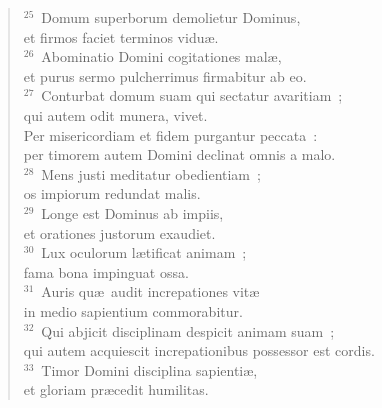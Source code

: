 \begin{flushleft}\begin{verse}${}^{25}$~Domum superborum demolietur Dominus,\\ et firmos faciet terminos vidu\ae .\\
${}^{26}$~Abominatio Domini cogitationes mal\ae ,\\ et purus sermo pulcherrimus firmabitur ab eo.\\
${}^{27}$~Conturbat domum suam qui sectatur avaritiam~;\\ qui autem odit munera, vivet.\\ Per misericordiam et fidem purgantur peccata~:\\ per timorem autem Domini declinat omnis a malo.\\
${}^{28}$~Mens justi meditatur obedientiam~;\\ os impiorum redundat malis.\\
${}^{29}$~Longe est Dominus ab impiis,\\ et orationes justorum exaudiet.\\
${}^{30}$~Lux oculorum l\ae tificat animam~;\\ fama bona impinguat ossa.\\
${}^{31}$~Auris qu\ae\ audit increpationes vit\ae \\ in medio sapientium commorabitur.\\
${}^{32}$~Qui abjicit disciplinam despicit animam suam~;\\ qui autem acquiescit increpationibus possessor est cordis.\\
${}^{33}$~Timor Domini disciplina sapienti\ae ,\\ et gloriam pr\ae cedit humilitas.\end{verse}\end{flushleft}


